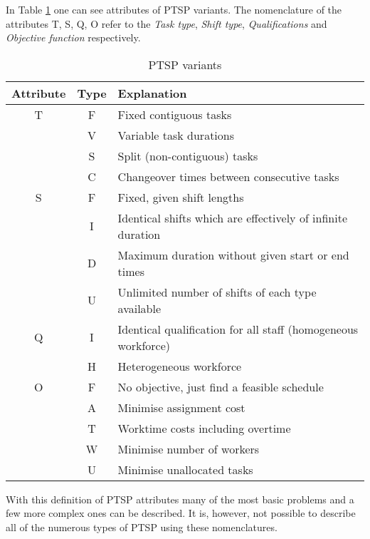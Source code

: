 In Table \ref{PTSP} one can see attributes of PTSP variants. The nomenclature of the attributes T, S, Q, O refer to the \textit{Task type}, \textit{Shift type}, \textit{Qualifications} and \textit{Objective function} respectively. 
\begin{table}[H]
\caption{PTSP variants}
\label{PTSP}
\begin{tabular}{|c|c|l|}
\hline
\textbf{Attribute} & \textbf{Type} & \textbf{Explanation} \\ \hline
T & F & Fixed contiguous tasks \\
& V & Variable task durations \\
& S & Split (non-contiguous) tasks \\
& C & Changeover times between consecutive tasks \\
\hline 
S & F & Fixed, given shift lengths \\
& I & Identical shifts which are effectively of infinite duration \\
& D & Maximum duration without given start or end times \\
& U & Unlimited number of shifts of each type available \\
\hline 
Q & I & Identical qualification for all staff (homogeneous workforce) \\
& H & Heterogeneous workforce \\
\hline 
O & F & No objective, just find a feasible schedule \\
& A & Minimise assignment cost \\
& T & Worktime costs including overtime \\
& W & Minimise number of workers \\
& U & Minimise unallocated tasks \\
\hline  

\end{tabular}
\end{table}

With this definition of PTSP attributes many of the most basic problems and a few more complex ones can be described. It is, however, not possible to describe all of the numerous types of PTSP using these nomenclatures.

